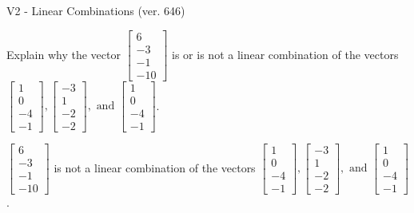 \begin{exercise}
  \begin{exerciseTitle}V2 - Linear Combinations (ver. 646)\end{exerciseTitle}
  \begin{exerciseStatement}
    Explain why the vector \(\left[\begin{array}{c}
6 \\
-3 \\
-1 \\
-10
\end{array}\right]\)  is or is not a linear 
	combination of the vectors \(\left[\begin{array}{c}
1 \\
0 \\
-4 \\
-1
\end{array}\right] , \left[\begin{array}{c}
-3 \\
1 \\
-2 \\
-2
\end{array}\right] , \text{ and } \left[\begin{array}{c}
1 \\
0 \\
-4 \\
-1
\end{array}\right]\).
	


  \end{exerciseStatement}
  \begin{exerciseAnswer}
   \(\left[\begin{array}{c}
6 \\
-3 \\
-1 \\
-10
\end{array}\right]\) 
  	 is not  
	a linear combination of the vectors \(\left[\begin{array}{c}
1 \\
0 \\
-4 \\
-1
\end{array}\right] , \left[\begin{array}{c}
-3 \\
1 \\
-2 \\
-2
\end{array}\right] , \text{ and } \left[\begin{array}{c}
1 \\
0 \\
-4 \\
-1
\end{array}\right]\).

	
  


  \end{exerciseAnswer}
\end{exercise}